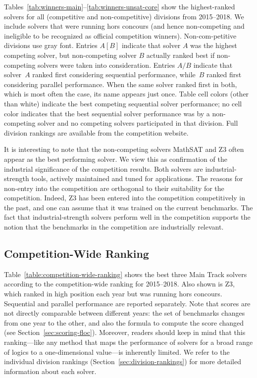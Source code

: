 \documentclass[dvipsnames,table,twoside,11pt]{article}
\newcommand{\maintrack}{Main Track\xspace}
\begin{document}
Tables~\ref{tab:winners-main}--\ref{tab:winners-unsat-core} show the
highest-ranked solvers for all (competitive and non-competitive) divisions from
2015--2018.
We include solvers that were running hors concours (and hence non-competing
and ineligible to be recognized as official competition winners).
Non-com-petitive divisions use gray font.
Entries $A [B]$ indicate that solver $A$ was the highest competing solver,
but non-competing solver $B$ actually ranked best if non-competing solvers
were taken into consideration.
Entries
$A/B$ indicate that solver~$A$ ranked first considering sequential
performance, while~$B$ ranked first considering parallel performance.
When the same solver ranked first in both, which is most often the
case, its name appears just once.
Table cell colors (other than white) indicate the best competing sequential
solver performance; no cell color indicates that the best sequential solver
performance was by a non-competing solver and no competing solvers participated
in that division.
Full division rankings are available from the competition website.

It is interesting to note that the non-competing solvers MathSAT and
Z3 often appear as the best performing solver.  We view this as
confirmation of the industrial significance of the competition
results.  Both solvers are industrial-strength tools, actively
maintained and tuned for applications.  The reasons for non-entry into
the competition are orthogonal to their suitability for the
competition.  Indeed, Z3 has been entered into the competition
competitively in the past, and one can assume that it was trained on
the current benchmarks.  The fact that industrial-strength solvers
perform well in the competition supports the notion that the
benchmarks in the competition are industrially relevant.








\subsection{Competition-Wide Ranking}
\label{sec:floc}

Table~\ref{table:competition-wide-ranking} shows the best three
\maintrack solvers according to the competition-wide ranking for
2015--2018.  Also shown is Z3, which ranked in high position each year
but was running hors concours.  Sequential and parallel performance
are reported separately.
%
Note that scores are not directly comparable between different years:
the set of benchmarks changes from one year to the other, and also the
formula to compute the score changed (see
Section~\ref{sec:scoring-floc}).  Moreover, readers should keep in
mind that this ranking---like any method that maps the performance of
solvers for a broad range of logics to a one-dimensional value---is
inherently limited.  We refer to the individual division rankings
(Section~\ref{sec:division-rankings}) for more detailed information
about each solver.
\end{document}
